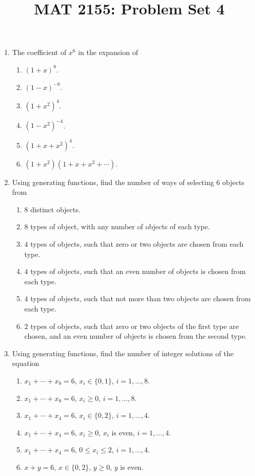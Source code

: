 \documentclass[svgnames]{amsart}
\title{MAT 2155: Problem Set 4}
\date{}
\begin{document}
\maketitle
\begin{enumerate}[leftmargin=*]
\item The coefficient of $x^6$ in the expansion of
\begin{enumerate}[label=(\roman*)]
	\item $(1 + x)^8$.
	\item $(1 - x)^{-8}$.
	\item $(1 + x^2)^4$.
	\item $(1 - x^2)^{-4}$.
	\item $(1 + x + x^2)^4$.
	\item $(1 + x^2)(1 + x + x^2 + \cdots)$.
\end{enumerate}

\item Using generating functions, find the number of ways of selecting $6$ objects from
\begin{enumerate}[label=(\roman*)]
	\item $8$ distinct objects.
	\item $8$ types of object, with any number of objects of each type.
	\item $4$ types of objects, such that zero or two objects are chosen from each type.
	\item $4$ types of objects, such that an even number of objects is chosen from each type.
	\item $4$ types of objects, such that not more than two objects are chosen from each type.
	\item $2$ types of objects, such that zero or two objects of the first type are chosen, and an even number of objects is chosen from the second type.
\end{enumerate}

\item Using generating functions, find the number of integer solutions of the equation
\begin{enumerate}[label=(\roman*)]
	\item $x_1 + \cdots + x_8 = 6$, $x_i \in \{0, 1\}$, $i = 1, \ldots, 8$.
	\item $x_1 + \cdots + x_8 = 6$, $x_i \ge 0$, $i = 1, \ldots, 8$.
	\item $x_1 + \cdots + x_4 = 6$, $x_i \in \{0, 2\}$, $i = 1, \ldots, 4$.
	\item $x_1 + \cdots + x_4 = 6$, $x_i \ge 0$, $x_i$ is even, $i = 1, \ldots, 4$.
	\item $x_1 + \cdots + x_4 = 6$, $0 \le x_i \le 2$, $i = 1, \ldots, 4$.
	\item $x + y = 6$, $x \in \{0, 2\}$, $y \ge 0$, $y$ is even.
\end{enumerate}


\end{enumerate}
\end{document}
